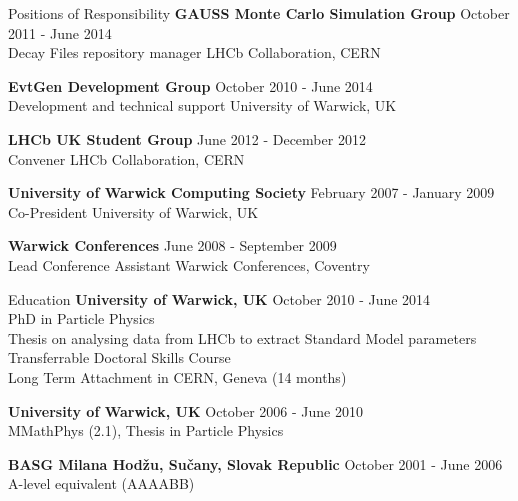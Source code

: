 \documentclass{format/resume} %
\begin{document}

\begin{rSection}{Positions of Responsibility}
  {\bf GAUSS Monte Carlo Simulation Group} \hfill { October 2011 - June 2014} \\
  {Decay Files repository manager} \hfill {LHCb Collaboration, CERN}

  {\bf EvtGen Development Group} \hfill { October 2010 - June 2014 } \\
  {Development and technical support} \hfill {University of Warwick, UK}

  {\bf LHCb UK Student Group} \hfill { June 2012 - December 2012 } \\
  {Convener} \hfill {LHCb Collaboration, CERN}

  {\bf University of Warwick Computing Society} \hfill { February 2007 - January 2009 } \\
  {Co-President} \hfill {University of Warwick, UK}

  {\bf Warwick Conferences} \hfill { June 2008 - September 2009} \\
  { Lead Conference Assistant} \hfill {Warwick Conferences, Coventry}

\end{rSection}

\newpage


\begin{rSection}{Education}
  {\bf University of Warwick, UK} \hfill {October 2010 - June 2014} \\
  PhD in Particle Physics \\
  Thesis on analysing data from LHCb to extract Standard Model parameters\\
  Transferrable Doctoral Skills Course \\
  Long Term Attachment in CERN, Geneva (14 months)

  {\bf University of Warwick, UK} \hfill {October 2006 - June 2010} \\
  MMathPhys (2.1), Thesis in Particle Physics

  {\bf BASG Milana Hod\v{z}u, Su\v{c}any, Slovak Republic} \hfill {October 2001 - June 2006} \\
  A-level equivalent (AAAABB)
\end{rSection}
\end{document}
